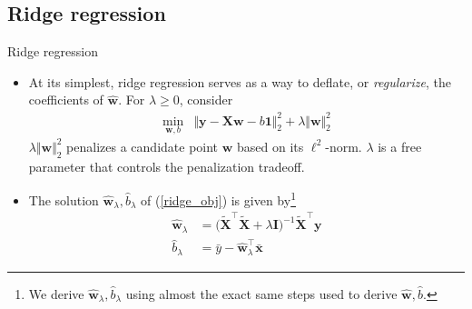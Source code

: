 \documentclass{beamer}
\numberwithin{equation}{section}
\newcommand{\aref}[1]{\alert{\ref{#1}}}
\begin{document}
\subsection{Ridge regression}

\begin{frame}{Ridge regression}
    \begin{itemize}
        \item
        At its simplest, ridge regression serves as a way to deflate, or
        \textit{regularize}, the coefficients of $ \hat{\mathbf{w}} $. For
        $ \lambda \ge 0 $, consider
        \begin{equation} \label{ridge_obj}
            \begin{array}{ll}
                \displaystyle\min_{\mathbf{w}, b} &
                \Vert\mathbf{y} - \mathbf{Xw} - b\mathbf{1}\Vert_2^2 +
                \lambda\Vert\mathbf{w}\Vert_2^2
            \end{array}
        \end{equation}
        $ \lambda\Vert\mathbf{w}\Vert_2^2 $ penalizes a candidate point
        $ \mathbf{w} $ based on its $ \ell^2 $-norm. $ \lambda $ is a free
        parameter that controls the penalization tradeoff.

        \item
        The solution $ \hat{\mathbf{w}}_\lambda, \hat{b}_\lambda $ of
        (\aref{ridge_obj}) is given by\footnote{
            We derive $ \hat{\mathbf{w}}_\lambda, \hat{b}_\lambda $ using
            almost the exact same steps used to derive $ \hat{\mathbf{w}},
            \hat{b} $.
        }
        \begin{equation} \label{ridge_sol}
            \begin{split}
                \hat{\mathbf{w}}_\lambda & = \big(
	                \tilde{\mathbf{X}}^\top\tilde{\mathbf{X}} +
	                \lambda\mathbf{I}
	            \big)^{-1}\tilde{\mathbf{X}}^\top\mathbf{y} \\
	            \hat{b}_\lambda & = \bar{y} - \hat{\mathbf{w}}_\lambda^\top
	            \bar{\mathbf{x}}
            \end{split}
        \end{equation}
    \end{itemize}
\end{frame}
\end{document}
